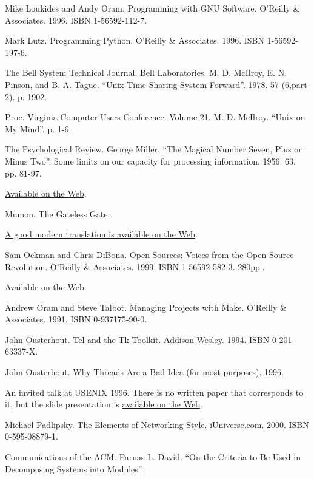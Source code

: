 \documentclass[12pt,oneside]{book}
\begin{document}
\begin{common-format}
\begin{thebibliography}{9}
 Mike Loukides and Andy Oram. Programming with GNU Software. O'Reilly \&{} Associates. 1996. ISBN 1-56592-112-7.

 Mark Lutz. Programming Python. O'Reilly \&{} Associates. 1996. ISBN 1-56592-197-6.

 The Bell System Technical Journal. Bell Laboratories. M. D. McIlroy, E. N. Pinson, and B. A. Tague. “Unix Time-Sharing System Forward”. 1978. 57 (6,part 2). p. 1902.

 Proc. Virginia Computer Users Conference. Volume 21. M. D. McIlroy. “Unix on My Mind”. p. 1-6.

 The Psychological Review. George Miller. “The Magical Number Seven, Plus or Minus Two”. Some limits on our capacity for processing information. 1956. 63. pp. 81-97.

\href{http://www.well.com/user/smalin/miller.html}{Available on the Web}.

 Mumon. The Gateless Gate.

\href{http://www.ibiblio.org/zen/cgi-bin/koan-index.pl}{A good modern translation is available on the Web}.

 Sam Ockman and Chris DiBona. Open Sources: Voices from the Open Source Revolution. O'Reilly \&{} Associates. 1999. ISBN 1-56592-582-3. 280pp..

\href{http://www.oreilly.com/catalog/opensources/book/toc.html}{Available on the Web}.

 Andrew Oram and Steve Talbot. Managing Projects with Make. O'Reilly \&{} Associates. 1991. ISBN 0-937175-90-0.

 John Ousterhout. Tcl and the Tk Toolkit. Addison-Wesley. 1994. ISBN 0-201-63337-X.

 John Ousterhout. Why Threads Are a Bad Idea (for most purposes). 1996.

An invited talk at USENIX 1996. There is no written paper that corresponds to it, but the slide presentation is \href{http://home.pacbell.net/ouster/threads.pdf}{available on the Web}.

 Michael Padlipsky. The Elements of Networking Style. iUniverse.com. 2000. ISBN 0-595-08879-1.

 Communications of the ACM. Parnas L. David. “On the Criteria to Be Used in Decomposing Systems into Modules”.


\end{thebibliography}
\end{common-format}
\end{document}
